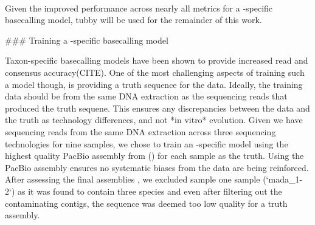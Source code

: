 \begin{markdown}

\\

Given the improved performance across nearly all metrics for a \mtb{}-specific \ont{} basecalling model, tubby will be used for the remainder of this work. 



### Training a \mtb{}-specific \ont{} basecalling model

Taxon-specific \ont{} basecalling models have been shown to provide increased read and consensus accuracy(CITE). One of the most challenging aspects of training such a model though, is providing a truth sequence for the \ont{} data. Ideally, the training data should be from the same DNA extraction as the sequencing reads that produced the truth sequene. This ensures any discrepancies between the \ont{} data and the truth as technology differences, and not *in vitro* evolution. Given we have sequencing reads from the same DNA extraction across three sequencing technologies for nine samples, we chose to train an \mtb{}-specific model using the highest quality PacBio assembly from () for each sample as the truth. Using the PacBio assembly ensures no systematic biases from the \ont{} data are being reinforced.   
After assessing the final assemblies , we excluded sample one sample (`mada_1-2`) as it was found to contain three species and even after filtering out the contaminating contigs, the \mtb{} sequence was deemed too low quality for a truth assembly.  

\end{markdown}
